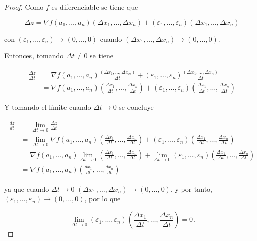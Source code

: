 \documentclass[
  a4paper,
]{scrreport}
\theoremstyle{definition}
\theoremstyle{plain}
\theoremstyle{plain}
\theoremstyle{definition}
\theoremstyle{definition}
\theoremstyle{plain}
\theoremstyle{remark}
\begin{document}
\begin{tcolorbox}[enhanced jigsaw, breakable, title=\textcolor{quarto-callout-note-color}{\faInfo}\hspace{0.5em}{Demostración}, toprule=.15mm, coltitle=black, arc=.35mm, rightrule=.15mm, colframe=quarto-callout-note-color-frame, colbacktitle=quarto-callout-note-color!10!white, toptitle=1mm, titlerule=0mm, leftrule=.75mm, opacityback=0, colback=white, bottomrule=.15mm, bottomtitle=1mm, left=2mm, opacitybacktitle=0.6]

\begin{proof}

Como \(f\) es diferenciable se tiene que

\[
\Delta z = \nabla f(a_1,\ldots,a_n) (\Delta x_1,\ldots, \Delta x_n) + (\varepsilon_1,\ldots, \varepsilon_n)(\Delta x_1,\ldots, \Delta x_n)
\]

con \((\varepsilon_1,\ldots,\varepsilon_n) \to (0,\ldots,0)\) cuando
\((\Delta x_1, \ldots, \Delta x_n) \to (0,\ldots,0)\).

Entonces, tomando \(\Delta t\neq 0\) se tiene

\begin{align*}
\frac{\Delta z}{\Delta t}
&= \nabla f(a_1,\ldots,a_n) \frac{(\Delta x_1,\ldots, \Delta x_n)}{\Delta t} + (\varepsilon_1,\ldots, \varepsilon_n) \frac{(\Delta x_1,\ldots, \Delta x_n)}{\Delta t} \\
&= \nabla f(a_1,\ldots,a_n) \left(\frac{\Delta x_1}{\Delta t},\ldots, \frac{\Delta x_n}{\Delta t}\right) + (\varepsilon_1,\ldots, \varepsilon_n) \left(\frac{\Delta x_1}{\Delta t},\ldots, \frac{\Delta x_n}{\Delta t}\right)
\end{align*}

Y tomando el límite cuando \(\Delta t \to 0\) se concluye

\begin{align*}
\frac{dz}{dt} &=
\lim_{\Delta t\to 0}\frac{\Delta z}{\Delta t} \\
&= \lim_{\Delta t\to 0} \nabla f(a_1,\ldots,a_n) \left(\frac{\Delta x_1}{\Delta t},\ldots, \frac{\Delta x_n}{\Delta t}\right) + (\varepsilon_1,\ldots, \varepsilon_n) \left(\frac{\Delta x_1}{\Delta t},\ldots, \frac{\Delta x_n}{\Delta t}\right) \\
&= \nabla f(a_1,\ldots,a_n)  \lim_{\Delta t\to 0}\left(\frac{\Delta x_1}{\Delta t},\ldots, \frac{\Delta x_n}{\Delta t}\right) + \lim_{\Delta t \to 0}(\varepsilon_1,\ldots, \varepsilon_n) \left(\frac{\Delta x_1}{\Delta t},\ldots, \frac{\Delta x_n}{\Delta t}\right) \\
&= \nabla f(a_1,\ldots,a_n) \left(\frac{dx_1}{dt},\ldots, \frac{dx_n}{dt}\right)
\end{align*}

ya que cuando \(\Delta t \to 0\)
\((\Delta x_1, \ldots, \Delta x_n) \to (0,\ldots,0)\), y por tanto,
\((\varepsilon_1,\ldots,\varepsilon_n) \to (0,\ldots,0)\), por lo que

\[
\lim_{\Delta t\to  0} (\varepsilon_1,\ldots, \varepsilon_n) \left(\frac{\Delta x_1}{\Delta t},\ldots, \frac{\Delta x_n}{\Delta t}\right) = 0.
\]

\end{proof}

\end{tcolorbox}
\end{document}
